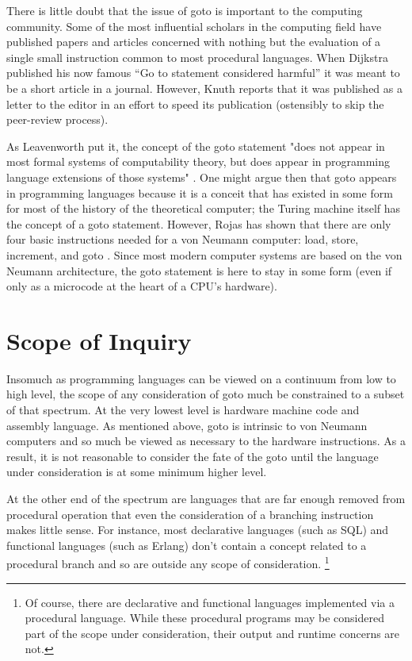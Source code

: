 \documentclass[letterpaper,10pt,twocolumn]{article}
\begin{document}
There is little doubt that the issue of goto is important to the computing community.
Some of the most influential scholars in the computing field have published
papers and articles concerned with nothing but the evaluation of a single small
instruction common to most procedural languages.
When Dijkstra published his now famous ``Go to statement considered harmful''
\cite{dijkstra} it was meant to be a short article in a journal.  However, Knuth
reports that it was published as a letter to the editor in an effort to speed
its publication \cite{knuth} (ostensibly to skip the peer-review process).

As Leavenworth put it,
the concept of the goto statement "does not appear in most formal systems of
computability theory, but does appear in programming language extensions of those
systems" \cite{leavenworth}.  One might argue then that goto appears in programming
languages because it is a conceit that has existed in some form for most of the
history of the theoretical computer; the Turing machine itself has the concept of
a goto statement.
\label{goto_von_neumann} However, Rojas has shown that there are only four
basic instructions needed for a von Neumann computer: load, store, increment,
and goto \cite{rojas}.  Since most modern computer systems are based on the
von Neumann architecture, the goto statement is here to stay in some form (even
if only as a microcode at the heart of a CPU's hardware).

\section{Scope of Inquiry}

Insomuch as programming languages can be viewed on a continuum from low to high
level, the scope of any consideration of goto much be constrained to a subset
of that spectrum.  At the very lowest level is hardware machine code and assembly
language.  As mentioned above, goto is intrinsic to von Neumann computers and so
much be viewed as necessary to the hardware instructions.  As a result, it is
not reasonable to consider the fate of the goto until the language under
consideration is at some minimum higher level.

At the other end of the spectrum are languages that are far enough removed
from procedural operation that even the consideration of a branching instruction
makes little sense.  For instance, most declarative languages (such as SQL) and
functional languages (such as Erlang) don't contain a concept related to a
procedural branch and so are outside any scope of consideration.
\footnote{Of course, there are declarative and functional languages implemented
via a procedural language.  While these procedural programs may be considered
part of the scope under consideration, their output and runtime concerns are
not. }
\end{document}
